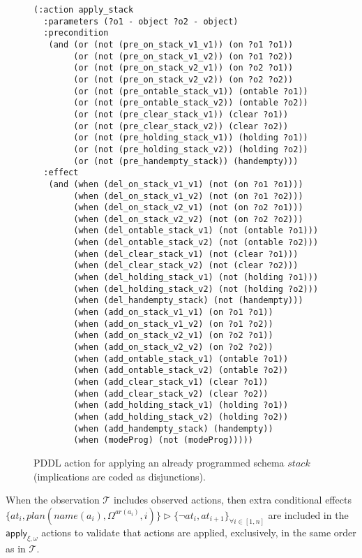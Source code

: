 \documentclass[letterpaper]{article} %
\begin{document}
\begin{itemize}
\begin{enumerate}
\begin{figure}
\begin{scriptsize}
\begin{verbatim}
(:action apply_stack
  :parameters (?o1 - object ?o2 - object)
  :precondition
   (and (or (not (pre_on_stack_v1_v1)) (on ?o1 ?o1))
        (or (not (pre_on_stack_v1_v2)) (on ?o1 ?o2))
        (or (not (pre_on_stack_v2_v1)) (on ?o2 ?o1))
        (or (not (pre_on_stack_v2_v2)) (on ?o2 ?o2))
        (or (not (pre_ontable_stack_v1)) (ontable ?o1))
        (or (not (pre_ontable_stack_v2)) (ontable ?o2))
        (or (not (pre_clear_stack_v1)) (clear ?o1))
        (or (not (pre_clear_stack_v2)) (clear ?o2))
        (or (not (pre_holding_stack_v1)) (holding ?o1))
        (or (not (pre_holding_stack_v2)) (holding ?o2))
        (or (not (pre_handempty_stack)) (handempty)))
  :effect
   (and (when (del_on_stack_v1_v1) (not (on ?o1 ?o1)))
        (when (del_on_stack_v1_v2) (not (on ?o1 ?o2)))
        (when (del_on_stack_v2_v1) (not (on ?o2 ?o1)))
        (when (del_on_stack_v2_v2) (not (on ?o2 ?o2)))
        (when (del_ontable_stack_v1) (not (ontable ?o1)))
        (when (del_ontable_stack_v2) (not (ontable ?o2)))
        (when (del_clear_stack_v1) (not (clear ?o1)))
        (when (del_clear_stack_v2) (not (clear ?o2)))
        (when (del_holding_stack_v1) (not (holding ?o1)))
        (when (del_holding_stack_v2) (not (holding ?o2)))
        (when (del_handempty_stack) (not (handempty)))
        (when (add_on_stack_v1_v1) (on ?o1 ?o1))
        (when (add_on_stack_v1_v2) (on ?o1 ?o2))
        (when (add_on_stack_v2_v1) (on ?o2 ?o1))
        (when (add_on_stack_v2_v2) (on ?o2 ?o2))
        (when (add_ontable_stack_v1) (ontable ?o1))
        (when (add_ontable_stack_v2) (ontable ?o2))
        (when (add_clear_stack_v1) (clear ?o1))
        (when (add_clear_stack_v2) (clear ?o2))
        (when (add_holding_stack_v1) (holding ?o1))
        (when (add_holding_stack_v2) (holding ?o2))
        (when (add_handempty_stack) (handempty))
        (when (modeProg) (not (modeProg)))))
\end{verbatim}
\end{scriptsize}
 \caption{\small PDDL action for applying an already programmed schema $stack$ (implications are coded as disjunctions).}
\label{fig:compilation}
\end{figure}
When the observation $\mathcal{T}$ includes observed actions, then extra conditional effects $\{at_{i},plan(name(a_i),\Omega^{ar(a_i)},i)\}\rhd\{\neg at_{i},at_{i+1}\}_{\forall i\in [1,n]}$ are included in the $\mathsf{apply_{\xi,\omega}}$ actions to validate that actions are applied, exclusively, in the same order as in $\mathcal{T}$.\\


\end{enumerate}
\end{itemize}
\end{document}
